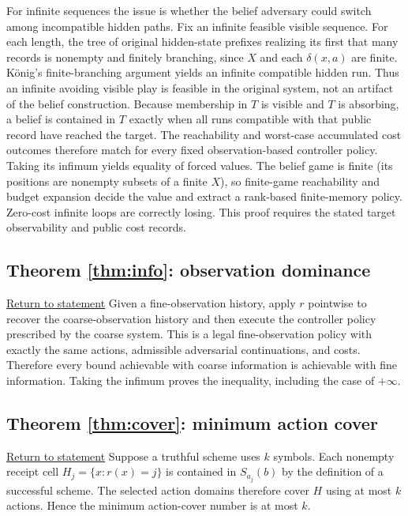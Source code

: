 \documentclass[11pt,letterpaper]{article}
\theoremstyle{definition}
\theoremstyle{remark}
\newcommand{\backstatement}[1]{\hyperlink{stmt:#1}{\footnotesize Return to statement}}
\begin{document}
For infinite sequences the issue is whether the belief adversary could switch among incompatible hidden paths. Fix an infinite feasible visible sequence. For each length, the tree of original hidden-state prefixes realizing its first that many records is nonempty and finitely branching, since $X$ and each $\delta(x,a)$ are finite. K\"onig's finite-branching argument yields an infinite compatible hidden run. Thus an infinite avoiding visible play is feasible in the original system, not an artifact of the belief construction. Because membership in $T$ is visible and $T$ is absorbing, a belief is contained in $T$ exactly when all runs compatible with that public record have reached the target. The reachability and worst-case accumulated cost outcomes therefore match for every fixed observation-based controller policy. Taking its infimum yields equality of forced values. The belief game is finite (its positions are nonempty subsets of a finite $X$), so finite-game reachability and budget expansion decide the value and extract a rank-based finite-memory policy. Zero-cost infinite loops are correctly losing. This proof requires the stated target observability and public cost records.

\hypertarget{proof:info}{}\subsection*{Theorem \ref{thm:info}: observation dominance} \backstatement{info}
Given a fine-observation history, apply $r$ pointwise to recover the coarse-observation history and then execute the controller policy prescribed by the coarse system. This is a legal fine-observation policy with exactly the same actions, admissible adversarial continuations, and costs. Therefore every bound achievable with coarse information is achievable with fine information. Taking the infimum proves the inequality, including the case of $+\infty$.

\hypertarget{proof:cover}{}\subsection*{Theorem \ref{thm:cover}: minimum action cover} \backstatement{cover}
Suppose a truthful scheme uses $k$ symbols. Each nonempty receipt cell $H_j=\{x:r(x)=j\}$ is contained in $S_{a_j}(b)$ by the definition of a successful scheme. The selected action domains therefore cover $H$ using at most $k$ actions. Hence the minimum action-cover number is at most $k$.
\end{document}

